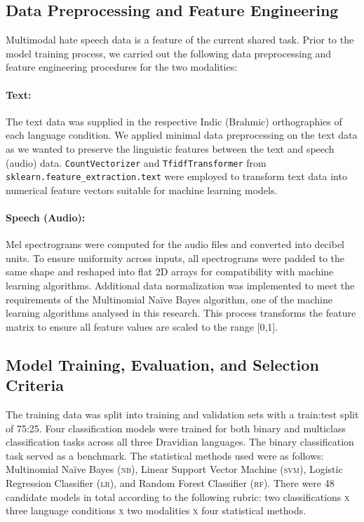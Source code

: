 \documentclass[11pt]{article}
\begin{document}
\subsection{Data Preprocessing and Feature Engineering} 
\label{subsec:data preprocessing and feature engineering}

    Multimodal hate speech data is a feature of the current shared task. Prior to the model training process, we carried out the following data preprocessing and feature engineering procedures for the two modalities:
 
    \paragraph{Text:} The text data was supplied in the respective Indic (Brahmic) orthographies of each language condition. We applied minimal data preprocessing on the text data as we wanted to preserve the linguistic features between the text and speech (audio) data. \texttt{CountVectorizer} and \texttt{TfidfTransformer} from \texttt{sklearn.feature\_extraction.text} were employed to transform text data into numerical feature vectors suitable for machine learning models. 


    \paragraph{Speech (Audio):} Mel spectrograms were computed for the audio files and converted into decibel units. To ensure uniformity across inputs, all spectrograms were padded to the same shape and reshaped into flat 2D arrays for compatibility with machine learning algorithms. Additional data normalization was implemented to meet the requirements of the Multinomial Na\"ive Bayes algorithm, one of the machine learning algorithms analysed in this research. This process transforms the feature matrix to ensure all feature values are scaled to the range [0,1].

\subsection{Model Training, Evaluation, and Selection Criteria}
\label{subsec:model training, evaluation, and selection criteria}
     
    The training data was split into training and validation sets with a train:test split of 75:25. Four classification models were trained for both binary and multiclass classification tasks across all three Dravidian languages. The binary classification task served as a benchmark. The statistical methods used were as follows: Multinomial Na\"ive Bayes (\textsc{nb}), Linear Support Vector Machine (\textsc{svm}), Logistic Regression Classifier (\textsc{lr}), and Random Forest Classifier (\textsc{rf}). There were 48 candidate models in total according to the following rubric: two classifications \textsc{x} three language conditions \textsc{x} two modalities \textsc{x} four statistical methods.
 
\end{document}
